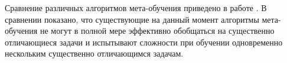 Сравнение различных алгоритмов мета-обучения приведено в работе \cite{yu2020meta}. В сравнении показано, что существующие на данный момент алгоритмы мета-обучения не могут в полной мере эффективно обобщаться на существенно отличающиеся задачи и испытывают сложности при обучении одновременно нескольким существенно отличающимся задачам.





